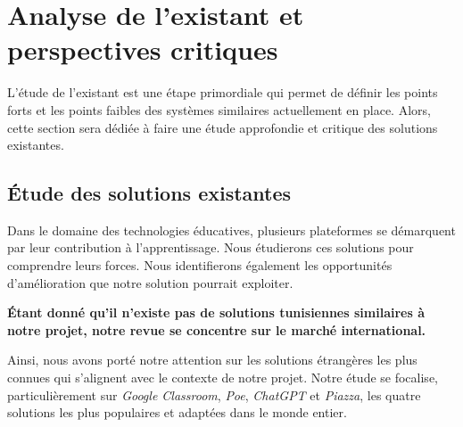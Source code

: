 
\section{Analyse de l'existant et perspectives critiques}
L’étude de l’existant est une étape primordiale qui permet de définir les points forts et les points faibles des systèmes similaires actuellement en place. Alors, cette section sera dédiée à faire une étude approfondie et critique des solutions existantes.                             

\subsection{Étude des solutions existantes}
Dans le domaine des technologies éducatives, plusieurs plateformes se démarquent par leur contribution à l'apprentissage. Nous étudierons ces solutions pour comprendre leurs forces. Nous identifierons également les opportunités d'amélioration que notre solution pourrait exploiter. 

\vspace{0.5em}
\noindent \textbf{Étant donné qu’il n’existe pas de solutions tunisiennes similaires à notre projet, notre revue se concentre sur le marché international.}

\vspace{0.5em}
\noindent Ainsi, nous avons porté notre attention sur les solutions étrangères les plus connues qui s'alignent avec le contexte de notre projet. Notre étude se focalise, particulièrement sur \textit{Google Classroom}, \textit{Poe}, \textit{ChatGPT} et \textit{Piazza}, les quatre solutions les plus populaires et adaptées dans le monde entier.

